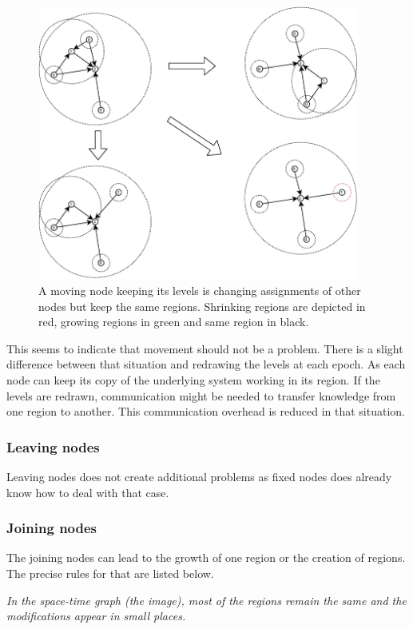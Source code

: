 \documentclass[a4paper,11pt,oneside]{report}
\begin{document}
\begin{figure}[!h] 
\centering
\includegraphics[width=300pt]{figures/LocarnoTreaties-Moving}
\caption{A moving node keeping its levels is changing assignments of other
    nodes but keep the same regions. Shrinking regions are depicted in red,
    growing regions in green and same region in black. }
\label{fig:LocarnoTreaties-Moving}
\end{figure}

This seems to indicate that movement should not be a problem. There is a
slight difference between that situation and redrawing the levels at each
epoch. As each node can keep its copy of the underlying system working in its
region. If the levels are redrawn, communication might be needed to transfer
knowledge from one region to another. This communication overhead is reduced in
that situation. 

\subsubsection{Leaving nodes}
Leaving nodes does not create additional problems as fixed nodes does already
know how to deal with that case. 

\subsubsection{Joining nodes}
The joining nodes can lead to the growth of one region or the creation
of regions. The precise rules for that are listed below. 

\textit{In the space-time graph (the image), most of the regions remain the same and
the modifications appear in small places.}
\end{document}

